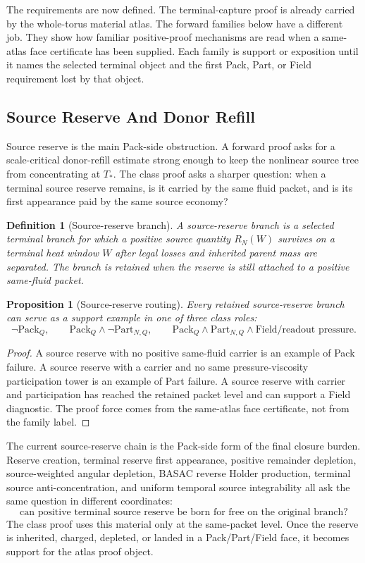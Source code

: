 \documentclass[11pt]{article}
\newtheorem{proposition}{Proposition}
\newtheorem{definition}{Definition}
\newcommand{\Pack}{\mathrm{Pack}}
\newcommand{\Part}{\mathrm{Part}}
\begin{document}
The requirements are now defined.
The terminal-capture proof is already carried by the whole-torus material atlas.
The forward families below have a different job.
They show how familiar positive-proof mechanisms are read when a same-atlas face certificate has been supplied.
Each family is support or exposition until it names the selected terminal object and the first Pack, Part, or Field requirement lost by that object.

\subsection{Source Reserve And Donor Refill}

Source reserve is the main Pack-side obstruction.
A forward proof asks for a scale-critical donor-refill estimate strong enough to keep the nonlinear source tree from concentrating at \(T_*\).
The class proof asks a sharper question: when a terminal source reserve remains, is it carried by the same fluid packet, and is its first appearance paid by the same source economy?

\begin{definition}[Source-reserve branch]
A source-reserve branch is a selected terminal branch for which a positive source quantity \(R_N(W)\) survives on a terminal heat window \(W\) after legal losses and inherited parent mass are separated.
The branch is retained when the reserve is still attached to a positive same-fluid packet.
\end{definition}

\begin{proposition}[Source-reserve routing]
Every retained source-reserve branch can serve as a support example in one of three class roles:
\[
  \neg\Pack_Q,\qquad
  \Pack_Q\wedge\neg\Part_{N,Q},\qquad
  \Pack_Q\wedge\Part_{N,Q}\wedge\text{Field/readout pressure}.
\]
\end{proposition}

\begin{proof}
A source reserve with no positive same-fluid carrier is an example of Pack failure.
A source reserve with a carrier and no same pressure-viscosity participation tower is an example of Part failure.
A source reserve with carrier and participation has reached the retained packet level and can support a Field diagnostic.
The proof force comes from the same-atlas face certificate, not from the family label.
\end{proof}

The current source-reserve chain is the Pack-side form of the final closure burden.
Reserve creation, terminal reserve first appearance, positive remainder depletion, source-weighted angular depletion, BASAC reverse Holder production, terminal source anti-concentration, and uniform temporal source integrability all ask the same question in different coordinates:
\[
  \text{can positive terminal source reserve be born for free on the original branch?}
\]
The class proof uses this material only at the same-packet level.
Once the reserve is inherited, charged, depleted, or landed in a Pack/Part/Field face, it becomes support for the atlas proof object.
\end{document}
